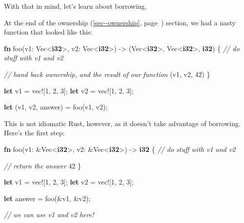 \documentclass[a4paper,]{book}
\renewcommand*{\hyperref}[2][\ar]{%
  \def\ar{#2}%
  #2 (\autoref{#1}, page~\pageref{#1})}
\newenvironment{Shaded}{\begin{snugshade}}{\end{snugshade}}
\newcommand{\KeywordTok}[1]{\textcolor[rgb]{0.13,0.29,0.53}{\textbf{{#1}}}}
\newcommand{\DecValTok}[1]{\textcolor[rgb]{0.00,0.00,0.81}{{#1}}}
\newcommand{\CommentTok}[1]{\textcolor[rgb]{0.56,0.35,0.01}{\textit{{#1}}}}
\newcommand{\OtherTok}[1]{\textcolor[rgb]{0.56,0.35,0.01}{{#1}}}
\newcommand{\NormalTok}[1]{{#1}}
\begin{document}
With that in mind, let's learn about borrowing.


At the end of the \hyperref[sec--ownership]{ownership} section, we had a
nasty function that looked like this:

\begin{Shaded}
\begin{Highlighting}[]
\KeywordTok{fn} \NormalTok{foo(v1: Vec<}\KeywordTok{i32}\NormalTok{>, v2: Vec<}\KeywordTok{i32}\NormalTok{>) -> (Vec<}\KeywordTok{i32}\NormalTok{>, Vec<}\KeywordTok{i32}\NormalTok{>, }\KeywordTok{i32}\NormalTok{) \{}
    \CommentTok{// do stuff with v1 and v2}

    \CommentTok{// hand back ownership, and the result of our function}
    \NormalTok{(v1, v2, }\DecValTok{42}\NormalTok{)}
\NormalTok{\}}

\KeywordTok{let} \NormalTok{v1 = }\OtherTok{vec!}\NormalTok{[}\DecValTok{1}\NormalTok{, }\DecValTok{2}\NormalTok{, }\DecValTok{3}\NormalTok{];}
\KeywordTok{let} \NormalTok{v2 = }\OtherTok{vec!}\NormalTok{[}\DecValTok{1}\NormalTok{, }\DecValTok{2}\NormalTok{, }\DecValTok{3}\NormalTok{];}

\KeywordTok{let} \NormalTok{(v1, v2, answer) = foo(v1, v2);}
\end{Highlighting}
\end{Shaded}

This is not idiomatic Rust, however, as it doesn't take advantage of
borrowing. Here's the first step:

\begin{Shaded}
\begin{Highlighting}[]
\KeywordTok{fn} \NormalTok{foo(v1: &Vec<}\KeywordTok{i32}\NormalTok{>, v2: &Vec<}\KeywordTok{i32}\NormalTok{>) -> }\KeywordTok{i32} \NormalTok{\{}
    \CommentTok{// do stuff with v1 and v2}

    \CommentTok{// return the answer}
    \DecValTok{42}
\NormalTok{\}}

\KeywordTok{let} \NormalTok{v1 = }\OtherTok{vec!}\NormalTok{[}\DecValTok{1}\NormalTok{, }\DecValTok{2}\NormalTok{, }\DecValTok{3}\NormalTok{];}
\KeywordTok{let} \NormalTok{v2 = }\OtherTok{vec!}\NormalTok{[}\DecValTok{1}\NormalTok{, }\DecValTok{2}\NormalTok{, }\DecValTok{3}\NormalTok{];}

\KeywordTok{let} \NormalTok{answer = foo(&v1, &v2);}

\CommentTok{// we can use v1 and v2 here!}
\end{Highlighting}
\end{Shaded}
\end{document}

